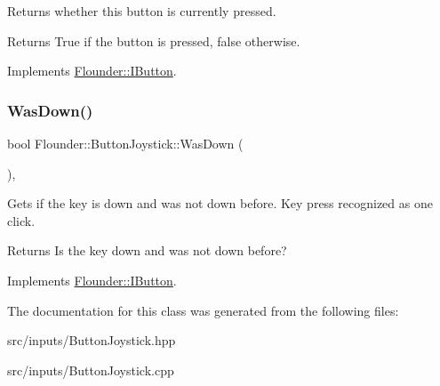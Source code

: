 Returns whether this button is currently pressed. 

\begin{DoxyReturn}{Returns}
True if the button is pressed, false otherwise. 
\end{DoxyReturn}


Implements \hyperlink{class_flounder_1_1_i_button_a264519250d835422748bcc1af9be38e3}{Flounder\+::\+I\+Button}.

\mbox{\label{class_flounder_1_1_button_joystick_ac5d6de45e62a7c38a328f217b89573e1}} 
\subsubsection{\texorpdfstring{Was\+Down()}{WasDown()}}
{\footnotesize\ttfamily bool Flounder\+::\+Button\+Joystick\+::\+Was\+Down (\begin{DoxyParamCaption}{ }\end{DoxyParamCaption})\hspace{0.3cm}{\ttfamily [override]}, {\ttfamily [virtual]}}



Gets if the key is down and was not down before. Key press recognized as one click. 

\begin{DoxyReturn}{Returns}
Is the key down and was not down before? 
\end{DoxyReturn}


Implements \hyperlink{class_flounder_1_1_i_button_af31c7669349991fe6a57beb8bd42c5b2}{Flounder\+::\+I\+Button}.



The documentation for this class was generated from the following files\+:\begin{DoxyCompactItemize}
\item 
src/inputs/Button\+Joystick.\+hpp\item 
src/inputs/Button\+Joystick.\+cpp\end{DoxyCompactItemize}
